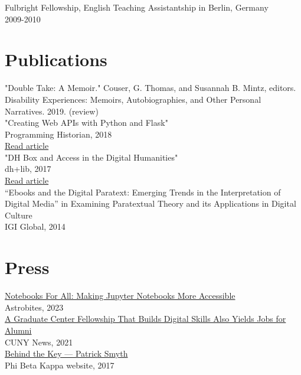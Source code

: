 \documentclass[11pt]{article}
\begin{document}
Fulbright Fellowship, English Teaching Assistantship in Berlin, Germany\\
2009-2010\\

\section*{Publications}
\label{sec:orgheadline5}
"Double Take: A Memoir." Couser, G. Thomas, and Susannah B. Mintz, editors. Disability Experiences: Memoirs, Autobiographies, and Other Personal Narratives. 2019. (review)\\

"Creating Web APIs with Python and Flask"\\
Programming Historian, 2018\\
\href{https://programminghistorian.org/lessons/creating-apis-with-python-and-flask}{Read article}\\

"DH Box and Access in the Digital Humanities"\\
dh+lib, 2017\\
\href{http://acrl.ala.org/dh/2017/06/21/dh-box-and-access-in-the-digital-humanities/}{Read article}\\

“Ebooks and the Digital Paratext: Emerging Trends in the Interpretation of Digital Media” in Examining Paratextual Theory and its Applications in Digital Culture\\
IGI Global, 2014\\


\section*{Press}
\label{sec:orgheadline6}
\href{https://astrobites.org/2023/06/10/notebooks-for-all/}{Notebooks For All: Making Jupyter Notebooks More Accessible}\\
Astrobites, 2023\\

\href{https://m.gc.cuny.edu/News/Detail?id=60526}{A Graduate Center Fellowship That Builds Digital Skills Also Yields Jobs for Alumni}\\
CUNY News, 2021\\

\href{https://www.pbk.org/Behind-the-Key/Patrick-Smyth}{Behind the Key — Patrick Smyth}\\
Phi Beta Kappa website, 2017\\
\end{document}
